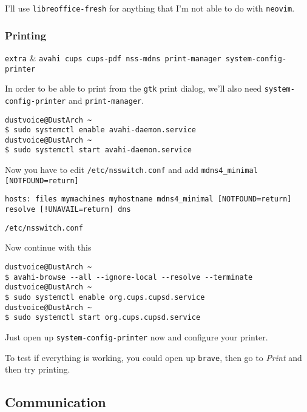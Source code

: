 \documentclass[10pt]{dustdoc}
\begin{document}
I’ll use \texttt{libreoffice-fresh} for anything that I’m not able to do with \texttt{neovim}.

\subsubsection{Printing}
\label{sec:printing}

\begin{packagetable}
    \texttt{extra} & \texttt{avahi cups cups-pdf nss-mdns print-manager system-config-printer} \\
\end{packagetable}

In order to be able to print from the \texttt{gtk} print dialog, we’ll also need \texttt{system-config-printer} and \texttt{print-manager}.

\begin{verbatim}
dustvoice@DustArch ~
$ sudo systemctl enable avahi-daemon.service
dustvoice@DustArch ~
$ sudo systemctl start avahi-daemon.service
\end{verbatim}

Now you have to edit \texttt{/etc/nsswitch.conf} and add\newline
\texttt{mdns4_minimal [NOTFOUND=return]}

\begin{mintedlisting}
    \begin{verbatim}
hosts: files mymachines myhostname mdns4_minimal [NOTFOUND=return] resolve [!UNAVAIL=return] dns
    \end{verbatim}

    \caption{\texttt{/etc/nsswitch.conf}}
\end{mintedlisting}

Now continue with this

\begin{verbatim}
dustvoice@DustArch ~
$ avahi-browse --all --ignore-local --resolve --terminate
dustvoice@DustArch ~
$ sudo systemctl enable org.cups.cupsd.service
dustvoice@DustArch ~
$ sudo systemctl start org.cups.cupsd.service
\end{verbatim}

Just open up \texttt{system-config-printer} now and configure your printer.

To test if everything is working, you could open up \texttt{brave}, then go to \emph{Print} and then try printing.

\subsection{Communication}
\label{sec:gui-communication}
\end{document}

